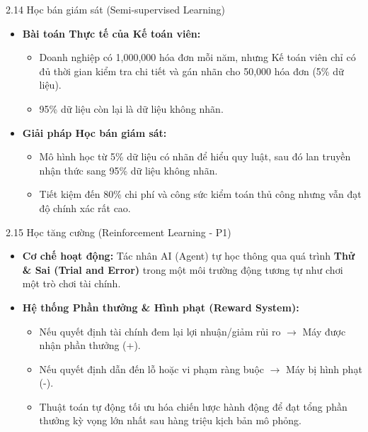 \documentclass[aspectratio=169]{beamer}
\begin{document}
\begin{frame}{2.14 Học bán giám sát (Semi-supervised Learning)}
    \begin{itemize}
        \item \textbf{Bài toán Thực tế của Kế toán viên:}
        \begin{itemize}
            \item Doanh nghiệp có 1,000,000 hóa đơn mỗi năm, nhưng Kế toán viên chỉ có đủ thời gian kiểm tra chi tiết và gán nhãn cho 50,000 hóa đơn (5\% dữ liệu).
            \item 95\% dữ liệu còn lại là dữ liệu không nhãn.
        \end{itemize}
        \item \textbf{Giải pháp Học bán giám sát:}
        \begin{itemize}
            \item Mô hình học từ 5\% dữ liệu có nhãn để hiểu quy luật, sau đó lan truyền nhận thức sang 95\% dữ liệu không nhãn.
            \item Tiết kiệm đến 80\% chi phí và công sức kiểm toán thủ công nhưng vẫn đạt độ chính xác rất cao.
        \end{itemize}
    \end{itemize}
\end{frame}

\begin{frame}{2.15 Học tăng cường (Reinforcement Learning - P1)}
    \begin{itemize}
        \item \textbf{Cơ chế hoạt động:} Tác nhân AI (Agent) tự học thông qua quá trình \textbf{Thử \& Sai (Trial and Error)} trong một môi trường động tương tự như chơi một trò chơi tài chính.
        \item \textbf{Hệ thống Phần thưởng \& Hình phạt (Reward System):}
        \begin{itemize}
            \item Nếu quyết định tài chính đem lại lợi nhuận/giảm rủi ro $\rightarrow$ Máy được nhận phần thưởng (+).
            \item Nếu quyết định dẫn đến lỗ hoặc vi phạm ràng buộc $\rightarrow$ Máy bị hình phạt (-).
            \item Thuật toán tự động tối ưu hóa chiến lược hành động để đạt tổng phần thưởng kỳ vọng lớn nhất sau hàng triệu kịch bản mô phỏng.
        \end{itemize}
    \end{itemize}
\end{frame}
\end{document}

